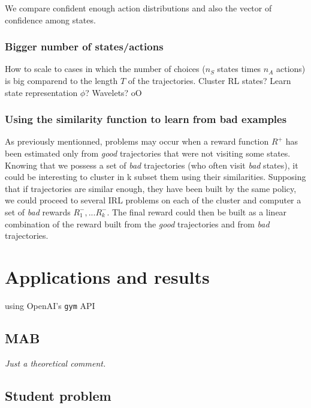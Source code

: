 \documentclass{article}
\begin{document}
We compare confident enough action distributions and also the vector of confidence among states.

\subsubsection{Bigger number of states/actions}

How to scale to cases in which the number of choices ($n_S$ states times $n_A$ actions) is big comparend to the length $T$ of the trajectories. Cluster RL states? Learn state representation $\phi$? Wavelets? oO

\subsubsection{Using the similarity function to learn from bad examples}

As previously mentionned, problems may occur when a reward function $R^+$ has been estimated only from \emph{good} trajectories that were not visiting some states. Knowing that we possess a set of \emph{bad} trajectories (who often visit \emph{bad} states), it could be interesting to cluster in k subset them using their similarities. Supposing that if trajectories are similar enough, they have been built by the same policy, we could proceed to several IRL problems on each of the cluster and computer a set of \emph{bad} rewards ${{R}_{1}^{-},...{R}_{k}^{-}}$. 
The final reward could then be built as a linear combination of the reward built from the \emph{good} trajectories and from \emph{bad} trajectories.

\section{Applications and results \label{sec:results}}

using OpenAI's \verb|gym| API

\subsection{MAB}

\emph{Just a theoretical comment.}

\subsection{Student problem}
\end{document}
